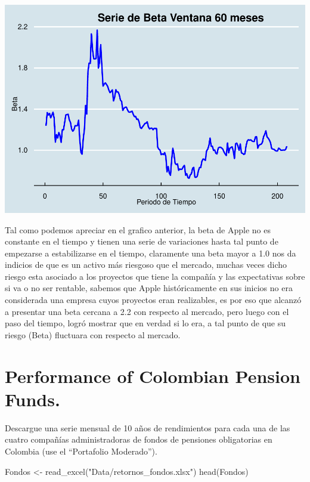 \documentclass[
  12pt,
]{article}
\newenvironment{Shaded}{\begin{snugshade}}{\end{snugshade}}
\newcommand{\FunctionTok}[1]{\textcolor[rgb]{0.00,0.00,0.00}{#1}}
\newcommand{\NormalTok}[1]{#1}
\newcommand{\OtherTok}[1]{\textcolor[rgb]{0.56,0.35,0.01}{#1}}
\newcommand{\StringTok}[1]{\textcolor[rgb]{0.31,0.60,0.02}{#1}}
\begin{document}
\begin{center}\includegraphics[width=0.95\linewidth]{figurasR/unnamed-chunk-17-1} \end{center}

Tal como podemos apreciar en el grafico anterior, la beta de Apple no es
constante en el tiempo y tienen una serie de variaciones hasta tal punto
de empezarse a estabilizarse en el tiempo, claramente una beta mayor a
1.0 nos da indicios de que es un activo más riesgoso que el mercado,
muchas veces dicho riesgo esta asociado a los proyectos que tiene la
compañía y las expectativas sobre si va o no ser rentable, sabemos que
Apple históricamente en sus inicios no era considerada una empresa cuyos
proyectos eran realizables, es por eso que alcanzó a presentar una beta
cercana a 2.2 con respecto al mercado, pero luego con el paso del
tiempo, logró mostrar que en verdad si lo era, a tal punto de que su
riesgo (Beta) fluctuara con respecto al mercado.

\hypertarget{performance-of-colombian-pension-funds.}{%
\section{Performance of Colombian Pension
Funds.}\label{performance-of-colombian-pension-funds.}}

Descargue una serie mensual de 10 años de rendimientos para cada una de
las cuatro compañías administradoras de fondos de pensiones obligatorias
en Colombia (use el ``Portafolio Moderado'').

\begin{Shaded}
\begin{Highlighting}[]
\NormalTok{Fondos }\OtherTok{\textless{}{-}} \FunctionTok{read\_excel}\NormalTok{(}\StringTok{"Data/retornos\_fondos.xlsx"}\NormalTok{)}
\FunctionTok{head}\NormalTok{(Fondos)}
\end{Highlighting}
\end{Shaded}
\end{document}

